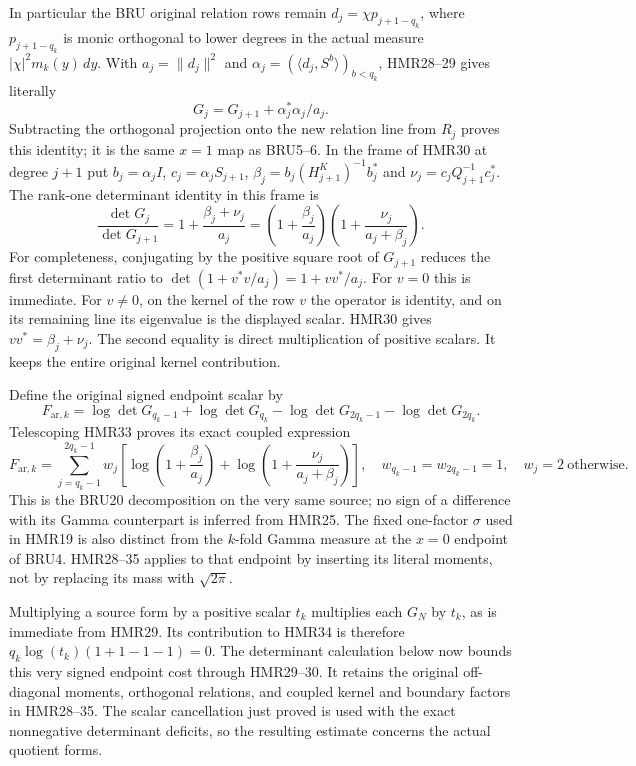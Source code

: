 \documentclass[11pt,a4paper]{article}
\begin{document}
In particular the BRU original relation rows remain
$d_j=\chi p_{j+1-q_k}$, where $p_{j+1-q_k}$ is
monic orthogonal to lower degrees in the actual
measure $|\chi|^2m_k(y)\,dy$. With
$a_j=\|d_j\|^2$ and
$\alpha_j=(\langle d_j,S^b\rangle)_{b<q_k}$,
HMR28--29 gives literally
\[
 G_j=G_{j+1}+\alpha_j^*\alpha_j/a_j.
 \tag{HMR32}
\]
Subtracting the orthogonal projection onto the
new relation line from $R_j$ proves this identity;
it is the same $x=1$ map as BRU5--6.
In the frame of HMR30 at degree $j+1$ put
$b_j=\alpha_jI$, $c_j=\alpha_jS_{j+1}$,
$\beta_j=b_j(H_{j+1}^K)^{-1}b_j^*$ and
$\nu_j=c_jQ_{j+1}^{-1}c_j^*$.
The rank-one determinant identity in this frame is
\[
 \frac{\det G_j}{\det G_{j+1}}
 =1+\frac{\beta_j+\nu_j}{a_j}
 =\left(1+\frac{\beta_j}{a_j}\right)
   \left(1+\frac{\nu_j}{a_j+\beta_j}\right).
 \tag{HMR33}
\]
For completeness, conjugating by the positive square root
of $G_{j+1}$ reduces the first determinant ratio to
$\det(1+v^*v/a_j)=1+vv^*/a_j$.
For $v=0$ this is immediate. For $v\ne0$,
on the kernel of the row $v$ the operator is identity,
and on its remaining line its eigenvalue is the displayed
scalar. HMR30 gives $vv^*=\beta_j+\nu_j$.
The second equality is direct multiplication of positive
scalars. It keeps the entire original kernel contribution.

Define the original signed endpoint scalar by
\[
 F_{\mathrm{ar},k}
 =\log\det G_{q_k-1}+\log\det G_{q_k}
  -\log\det G_{2q_k-1}-\log\det G_{2q_k}.
 \tag{HMR34}
\]
Telescoping HMR33 proves its exact coupled expression
\[
 F_{\mathrm{ar},k}
 =\sum_{j=q_k-1}^{2q_k-1}w_j
    \left[
      \log\left(1+\frac{\beta_j}{a_j}\right)
      +\log\left(1+\frac{\nu_j}{a_j+\beta_j}\right)
    \right],
 \quad w_{q_k-1}=w_{2q_k-1}=1,\quad w_j=2
 \ \text{otherwise}.
 \tag{HMR35}
\]
This is the BRU20 decomposition on the very same source;
no sign of a difference with its Gamma counterpart is
inferred from HMR25. The fixed one-factor $\sigma$ used
in HMR19 is also distinct from the $k$-fold Gamma measure
at the $x=0$ endpoint of BRU4. HMR28--35 applies to
that endpoint by inserting its literal moments, not
by replacing its mass with $\sqrt{2\pi}$.

Multiplying a source form by a positive scalar $t_k$
multiplies each $G_N$ by $t_k$, as is immediate from
HMR29. Its contribution to HMR34 is therefore
$q_k\log(t_k)(1+1-1-1)=0$.
The determinant calculation below now bounds this very signed
endpoint cost through HMR29--30. It retains the original
off-diagonal moments, orthogonal relations, and coupled kernel
and boundary factors in HMR28--35. The scalar cancellation just
proved is used with the exact nonnegative determinant deficits,
so the resulting estimate concerns the actual quotient forms.
\end{document}
